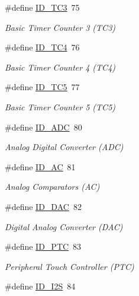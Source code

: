 \begin{DoxyCompactItemize}
\#define \mbox{\hyperlink{group___s_a_m_d21_g16_b__id_gac978ebe37e0ce9dfe2eec2f15ab83015}{I\+D\+\_\+\+T\+C3}}~75
\begin{DoxyCompactList}\small\item\em Basic Timer Counter 3 (T\+C3) \end{DoxyCompactList}\item 
\#define \mbox{\hyperlink{group___s_a_m_d21_g16_b__id_ga59ecaec462139ce30c8ebe1dc25f9f7d}{I\+D\+\_\+\+T\+C4}}~76
\begin{DoxyCompactList}\small\item\em Basic Timer Counter 4 (T\+C4) \end{DoxyCompactList}\item 
\#define \mbox{\hyperlink{group___s_a_m_d21_g16_b__id_ga60408f0e4285fc6e0e837aad86b862f8}{I\+D\+\_\+\+T\+C5}}~77
\begin{DoxyCompactList}\small\item\em Basic Timer Counter 5 (T\+C5) \end{DoxyCompactList}\item 
\#define \mbox{\hyperlink{group___s_a_m_d21_g16_b__id_gafb7efa537d1d64419483b97f642009fd}{I\+D\+\_\+\+A\+DC}}~80
\begin{DoxyCompactList}\small\item\em Analog Digital Converter (A\+DC) \end{DoxyCompactList}\item 
\#define \mbox{\hyperlink{group___s_a_m_d21_g16_b__id_ga20fe08f8d0b2a4e6c0dbb2371aacadb0}{I\+D\+\_\+\+AC}}~81
\begin{DoxyCompactList}\small\item\em Analog Comparators (AC) \end{DoxyCompactList}\item 
\#define \mbox{\hyperlink{group___s_a_m_d21_g16_b__id_ga2561118247335c13b56f7a79a17fceff}{I\+D\+\_\+\+D\+AC}}~82
\begin{DoxyCompactList}\small\item\em Digital Analog Converter (D\+AC) \end{DoxyCompactList}\item 
\#define \mbox{\hyperlink{group___s_a_m_d21_g16_b__id_ga6ce249818b3ff70438a4eff92e49d38e}{I\+D\+\_\+\+P\+TC}}~83
\begin{DoxyCompactList}\small\item\em Peripheral Touch Controller (P\+TC) \end{DoxyCompactList}\item 
\#define \mbox{\hyperlink{group___s_a_m_d21_g16_b__id_gac57cc3843ee128de44e5f43b5a272357}{I\+D\+\_\+\+I2S}}~84

\end{DoxyCompactItemize}
